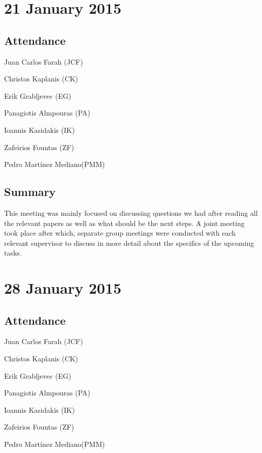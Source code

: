 \documentclass[a4paper,11pt]{article}
\begin{document}
\section*{21 January 2015}
\subsection*{Attendance}
\begin{compactenum}
\item Juan Carlos Farah (JCF)
\item Christos Kaplanis (CK)
\item Erik Grabljevec (EG)
\item Panagiotis Almpouras (PA)
\item Ioannis Kasidakis (IK)
\item Zafeirios Fountas (ZF)
\item Pedro Martínez Mediano(PMM)
\end{compactenum}

\subsection*{Summary}
This meeting was mainly focused on discussing questions we had after reading all the relevant papers as well as what should be the next steps. A joint meeting took place after which, separate group meetings were conducted with each relevant supervisor to discuss in more detail about the specifics of the upcoming tasks.

\maketitle
\section*{28 January 2015}
\subsection*{Attendance}
\begin{compactenum}
\item Juan Carlos Farah (JCF)
\item Christos Kaplanis (CK)
\item Erik Grabljevec (EG)
\item Panagiotis Almpouras (PA)
\item Ioannis Kasidakis (IK)
\item Zafeirios Fountas (ZF)
\item Pedro Martínez Mediano(PMM)
\end{compactenum}
\end{document}
